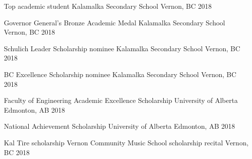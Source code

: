 



\begin{cvhonors}

  \cvhonor
    {Top academic student} %
    {Kalamalka Secondary School} %
    {Vernon, BC} %
    {2018} %

  \cvhonor
    {Governor General's Bronze Academic Medal}
    {Kalamalka Secondary School}
    {Vernon, BC}
    {2018}

\end{cvhonors}




\begin{cvhonors}

  \cvhonor
    {Schulich Leader Scholarship nominee} %
    {Kalamalka Secondary School} %
    {Vernon, BC} %
    {2018} %

  \cvhonor
    {BC Excellence Scholarship nominee}
    {Kalamalka Secondary School}
    {Vernon, BC}
    {2018}

  \cvhonor
    {Faculty of Engineering Academic Excellence Scholarship}
    {University of Alberta}
    {Edmonton, AB}
    {2018}

  \cvhonor
    {National Achievement Scholarship}
    {University of Alberta}
    {Edmonton, AB}
    {2018}

  \cvhonor
    {Kal Tire scholarship}
    {Vernon Community Music School scholarship recital}
    {Vernon, BC}
    {2018}

\end{cvhonors}
